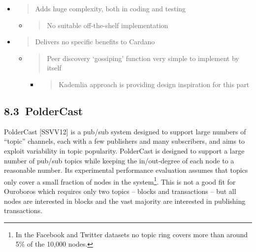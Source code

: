 \documentclass[11pt,a4paper]{article}
\begin{document}
\begin{itemize}
\item
  \begin{quote}
  Adds huge complexity, both in coding and testing
  \end{quote}

  \begin{itemize}
  \item
    \begin{quote}
    No suitable off-the-shelf implementation
    \end{quote}
  \end{itemize}
\item
  \begin{quote}
  Delivers no specific benefits to Cardano
  \end{quote}

  \begin{itemize}
  \item
    \begin{quote}
    Peer discovery `gossiping' function very simple to implement by
    itself
    \end{quote}

    \begin{itemize}
    \item
      \begin{quote}
      Kademlia approach is providing design inspiration for this part
      \end{quote}
    \end{itemize}
  \end{itemize}
\end{itemize}

\hypertarget{poldercast-1}{%
\subsection{​8.3​~PolderCast}\label{poldercast-1}}

PolderCast {[}SSVV12{]} is a pub/sub system designed to support large
numbers of ``topic'' channels, each with a few publishers and many
subscribers, and aims to exploit variability in topic popularity.
PolderCast is designed to support a large number of pub/sub topics while
keeping the in/out-degree of each node to a reasonable number. Its
experimental performance evaluation assumes that topics only cover a
small fraction of nodes in the system\footnote{In the Facebook and
  Twitter datasets no topic ring covers more than around 5\% of the
  10,000 nodes.}. This is not a good fit for Ouroboros which requires
only two topics -- blocks and transactions -- but all nodes are
interested in blocks and the vast majority are interested in publishing
transactions.
\end{document}
